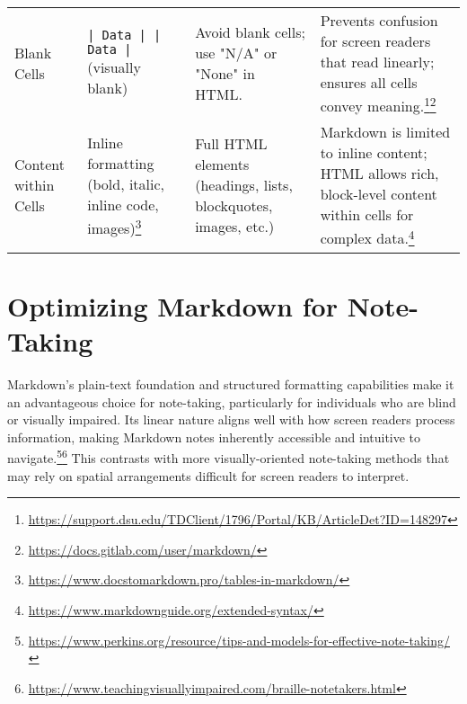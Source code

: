 \begin{table}[h!]
\begin{tabular}{|l|l|l|l|}
\addlinespace
Blank Cells & \texttt{| Data | | Data |} (visually blank) & Avoid blank cells; use "N/A" or "None" in HTML. & Prevents confusion for screen readers that read linearly; ensures all cells convey meaning.\footnote{\url{https://support.dsu.edu/TDClient/1796/Portal/KB/ArticleDet?ID=148297}}\footnote{\url{https://docs.gitlab.com/user/markdown/}} \\
\addlinespace
Content within Cells & Inline formatting (bold, italic, inline code, images)\footnote{\url{https://www.docstomarkdown.pro/tables-in-markdown/}} & Full HTML elements (headings, lists, blockquotes, images, etc.) & Markdown is limited to inline content; HTML allows rich, block-level content within cells for complex data.\footnote{\url{https://www.markdownguide.org/extended-syntax/}} \\
\bottomrule
\end{tabular}
\end{table}

\section{Optimizing Markdown for Note-Taking}
\label{sec:markdown-note-taking}

Markdown's plain-text foundation and structured formatting capabilities make it an advantageous choice for note-taking, particularly for individuals who are blind or visually impaired. Its linear nature aligns well with how screen readers process information, making Markdown notes inherently accessible and intuitive to navigate.\footnote{\url{https://www.perkins.org/resource/tips-and-models-for-effective-note-taking/}}\footnote{\url{https://www.teachingvisuallyimpaired.com/braille-notetakers.html}} This contrasts with more visually-oriented note-taking methods that may rely on spatial arrangements difficult for screen readers to interpret.

